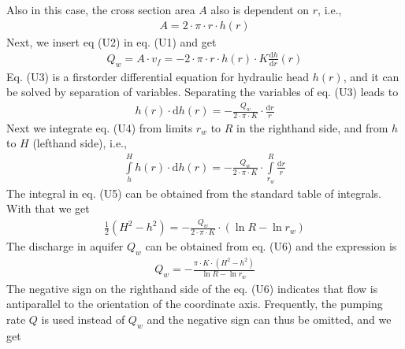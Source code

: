 \documentclass[letterpaper,10pt,english]{jupyterBook}
\begin{document}
\sphinxAtStartPar
Also in this case, the cross section area \(A\) also is dependent on \(r\), i.e.,
\begin{equation*}
\begin{split}
A = 2 \cdot \pi \cdot r \cdot h(r) \tag{U2}
\end{split}
\end{equation*}
\sphinxAtStartPar
Next, we insert eq (U2) in eq. (U1) and get
\begin{equation*}
\begin{split}
Q_w = A \cdot v_f = - 2 \cdot \pi \cdot r \cdot h(r)  \cdot K \frac{\textrm{d}h}{\textrm{d}r}(r) \tag{U3}
\end{split}
\end{equation*}
\sphinxAtStartPar
Eq. (U3) is a first\sphinxhyphen{}order differential equation for hydraulic head \(h(r)\), and it can be solved by separation of variables. Separating the variables of eq. (U3) leads to
\begin{equation*}
\begin{split}
h(r) \cdot \textrm{d}h(r) = - \frac{Q_w}{2 \cdot \pi \cdot K }\cdot \frac{\textrm{d}r}{r} \tag{U4}
\end{split}
\end{equation*}
\sphinxAtStartPar
Next we integrate eq. (U4) from limits \(r_w\) to \(R\) in the right\sphinxhyphen{}hand side, and from \(h\) to \(H\) (left\sphinxhyphen{}hand side), i.e.,
\begin{equation*}
\begin{split}
\int\limits_h^H h(r) \cdot \textrm{d}h(r) = - \frac{Q_w}{2 \cdot \pi \cdot K }\cdot \int\limits_{r_w}^{R}\frac{\textrm{d}r}{r} \tag{U5}
\end{split}
\end{equation*}
\sphinxAtStartPar
The integral in eq. (U5) can be obtained from the standard table of integrals. With that we get
\begin{equation*}
\begin{split}
\frac{1}{2}(H^2 - h^2) = - \frac{Q_w}{2 \cdot \pi \cdot K }\cdot (\ln R - \ln r_w) \tag{U6}
\end{split}
\end{equation*}
\sphinxAtStartPar
The discharge in aquifer \(Q_w\) can be obtained from eq. (U6) and the expression is
\begin{equation*}
\begin{split}
Q_w = -\frac{\pi\cdot K \cdot (H^2-h^2)}{\ln R - \ln r_w}\tag{U6}
\end{split}
\end{equation*}
\sphinxAtStartPar
The negative sign on the right\sphinxhyphen{}hand side of the eq. (U6) indicates that flow is anti\sphinxhyphen{}parallel to the orientation of the coordinate axis. Frequently, the pumping rate \(Q\) is used instead of \(Q_w\) and the negative sign can thus be
omitted, and we get
\end{document}
